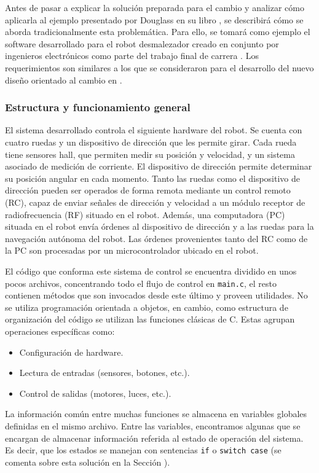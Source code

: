 Antes de pasar a explicar la solución preparada para el cambio y analizar cómo aplicarla al ejemplo presentado por Douglass en su libro \cite{douglass}, se describirá cómo se aborda tradicionalmente esta problemática. Para ello, se tomará como ejemplo el software desarrollado para el robot desmalezador creado en conjunto por ingenieros electrónicos como parte del trabajo final de carrera \cite{disenioViejo1, disenioViejo2}. Los requerimientos son similares a los que se consideraron para el desarrollo del nuevo diseño orientado al cambio en \cite{paperPomponio}.

\subsubsection*{Estructura y funcionamiento general}

El sistema desarrollado controla el siguiente hardware del robot. Se cuenta con cuatro ruedas y un dispositivo de dirección que les permite girar. Cada rueda tiene sensores \gls{hall}, que permiten medir su posición y velocidad, y un sistema asociado de medición de corriente. El dispositivo de dirección permite determinar su posición angular en cada momento. Tanto las ruedas como el dispositivo de dirección pueden ser operados de forma remota mediante un control remoto (RC), capaz de enviar señales de dirección y velocidad a un módulo receptor de radiofrecuencia (RF) situado en el robot. Además, una computadora (PC) situada en el robot envía órdenes al dispositivo de dirección y a las ruedas para la navegación autónoma del robot. Las órdenes provenientes tanto del RC como de la PC son procesadas por un microcontrolador ubicado en el robot.

El código que conforma este sistema de control se encuentra dividido en unos pocos archivos, concentrando todo el flujo de control en \verb|main.c|, el resto contienen métodos que son invocados desde este último y proveen utilidades. No se utiliza programación orientada a objetos, en cambio, como estructura de organización del código se utilizan las funciones clásicas de C. Estas agrupan operaciones específicas como:
\begin{itemize}
\item Configuración de hardware.
\item Lectura de entradas (sensores, botones, etc.).
\item Control de salidas (motores, luces, etc.).
\end{itemize}

La información común entre muchas funciones se almacena en variables globales definidas en el mismo archivo. Entre las variables, encontramos algunas que se encargan de almacenar información referida al estado de operación del sistema. Es decir, que los estados se manejan con sentencias \verb|if| o \verb|switch case| (se comenta sobre esta solución en la Sección ).

